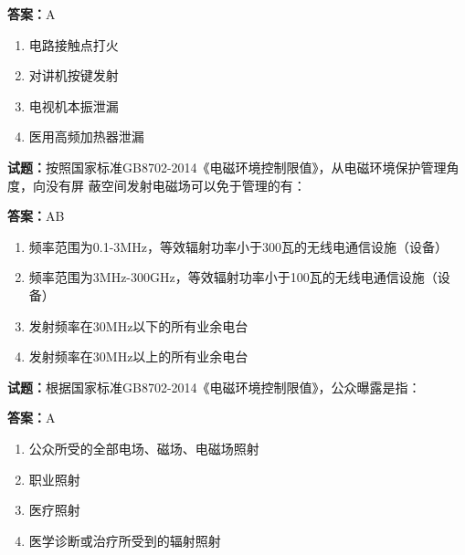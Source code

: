 \documentclass{ctexbook}
\begin{document}
\textbf{答案：}A 

\begin{enumerate}[leftmargin=3em]
  \item 电路接触点打火 

  \item 对讲机按键发射 

  \item 电视机本振泄漏 

  \item 医用高频加热器泄漏 

\end{enumerate}





\vspace{1em}

\textbf{试题：}按照国家标准GB8702-2014《电磁环境控制限值》，从电磁环境保护管理角度，向没有屏
蔽空间发射电磁场可以免于管理的有： 

\textbf{答案：}AB 

\begin{enumerate}[leftmargin=3em]
  \item 频率范围为0.1-3MHz，等效辐射功率小于300瓦的无线电通信设施（设备） 

  \item 频率范围为3MHz-300GHz，等效辐射功率小于100瓦的无线电通信设施（设备） 

  \item 发射频率在30MHz以下的所有业余电台 

  \item 发射频率在30MHz以上的所有业余电台 

\end{enumerate}





\vspace{1em}

\textbf{试题：}根据国家标准GB8702-2014《电磁环境控制限值》，公众曝露是指： 

\textbf{答案：}A 

\begin{enumerate}[leftmargin=3em]
  \item 公众所受的全部电场、磁场、电磁场照射 

  \item 职业照射 

  \item 医疗照射 

  \item 医学诊断或治疗所受到的辐射照射 

\end{enumerate}
\end{document}

